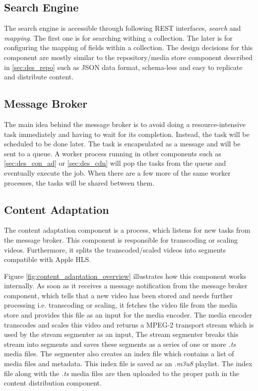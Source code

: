 \subsection{Search Engine\label{sec:des_se_en}}
The search engine is accessible through following \ac{REST} interfaces, \textit{search} and \textit{mapping}. The first one is for searching withing a collection. The later is for configuring the mapping of fields within a collection. The design decisions for this component are mostly similar to the repository/media store component described in \ref{sec:des_repo} such as \ac{JSON} data format, schema-less and easy to replicate and distribute content.

\subsection{Message Broker\label{sec:des_worker_queue}}
The main idea behind the message broker is to avoid doing a resource-intensive task immediately and having to wait for its completion. Instead, the task will be scheduled to be done later. The task is encapsulated as a message and  will be sent to a queue. A worker process running in other components such as \ref{sec:des_con_ad} or \ref{sec:des_cdn} will pop the tasks from the queue and eventually execute the job. When there are a few more of the same worker processes, the tasks will be shared between them.


\subsection{Content Adaptation\label{sec:des_con_ad}}
The content adaptation component is a process, which listens for new tasks from the message broker. This component is responsible for transcoding or scaling videos. Furthermore, it splits the transcoded/scaled videos into segments compatible with  Apple \ac{HLS}. %

Figure \ref{fig:content_adaptation_overview} illustrates how this component works internally. As soon as it receives a message notification from the message broker component, which tells that a new video has been stored and needs further processing i.e. transcoding or scaling, it fetches the video file from the media store and provides this file as an input for the media encoder. The media encoder transcodes and scales this video and returns a MPEG-2 transport stream which is used by the stream segmenter as an input, The stream segmenter breaks this stream into segments and saves these segments as a series of one or more \textit{.ts} media files. The segmenter also creates an index file which contains a list of media files and metadata. This index file is saved as an \textit{.m3u8} playlist. The index file along with the \textit{.ts} media files are then uploaded to the proper path in the content distribution component.

